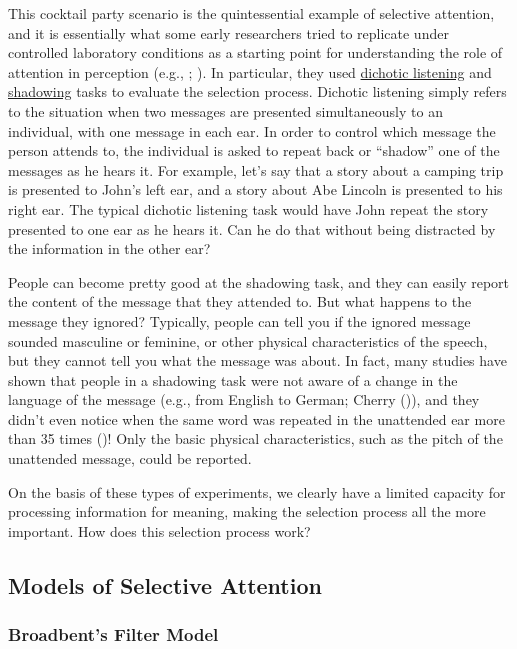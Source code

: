 \documentclass[
]{krantz}
\begin{document}
This cocktail party scenario is the quintessential example of selective attention, and it is essentially what some early researchers tried to replicate under controlled laboratory conditions as a starting point for understanding the role of attention in perception (e.g., ; ). In particular, they used \hyperref[dichotic-listening]{dichotic listening} and \hyperref[shadowing]{shadowing} tasks to evaluate the selection process. Dichotic listening simply refers to the situation when two messages are presented simultaneously to an individual, with one message in each ear. In order to control which message the person attends to, the individual is asked to repeat back or ``shadow'' one of the messages as he hears it. For example, let's say that a story about a camping trip is presented to John's left ear, and a story about Abe Lincoln is presented to his right ear. The typical dichotic listening task would have John repeat the story presented to one ear as he hears it. Can he do that without being distracted by the information in the other ear?

People can become pretty good at the shadowing task, and they can easily report the content of the message that they attended to. But what happens to the message they ignored? Typically, people can tell you if the ignored message sounded masculine or feminine, or other physical characteristics of the speech, but they cannot tell you what the message was about. In fact, many studies have shown that people in a shadowing task were not aware of a change in the language of the message (e.g., from English to German; Cherry ()), and they didn't even notice when the same word was repeated in the unattended ear more than 35 times ()! Only the basic physical characteristics, such as the pitch of the unattended message, could be reported.

On the basis of these types of experiments, we clearly have a limited capacity for processing information for meaning, making the selection process all the more important. How does this selection process work?

\subsection*{Models of Selective Attention}\label{models-of-selective-attention}


\subsubsection*{Broadbent's Filter Model}\label{broadbents-filter-model}
\end{document}
